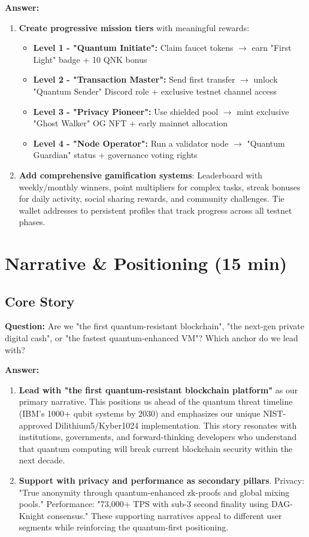 \documentclass[11pt,a4paper]{article}
\begin{document}
\textbf{Answer:}
\begin{enumerate}
\item \textbf{Create progressive mission tiers} with meaningful rewards:
\begin{itemize}
\item \textbf{Level 1 - "Quantum Initiate":} Claim faucet tokens $\rightarrow$ earn "First Light" badge + 10 QNK bonus
\item \textbf{Level 2 - "Transaction Master":} Send first transfer $\rightarrow$ unlock "Quantum Sender" Discord role + exclusive testnet channel access
\item \textbf{Level 3 - "Privacy Pioneer":} Use shielded pool $\rightarrow$ mint exclusive "Ghost Walker" OG NFT + early mainnet allocation
\item \textbf{Level 4 - "Node Operator":} Run a validator node $\rightarrow$ "Quantum Guardian" status + governance voting rights
\end{itemize}

\item \textbf{Add comprehensive gamification systems}: Leaderboard with weekly/monthly winners, point multipliers for complex tasks, streak bonuses for daily activity, social sharing rewards, and community challenges. Tie wallet addresses to persistent profiles that track progress across all testnet phases.
\end{enumerate}

\section{Narrative \& Positioning (15 min)}

\subsection{Core Story}
\textbf{Question:} Are we "the first quantum-resistant blockchain", "the next-gen private digital cash", or "the fastest quantum-enhanced VM"? Which anchor do we lead with?

\textbf{Answer:}
\begin{enumerate}
\item \textbf{Lead with "the first quantum-resistant blockchain platform"} as our primary narrative. This positions us ahead of the quantum threat timeline (IBM's 1000+ qubit systems by 2030) and emphasizes our unique NIST-approved Dilithium5/Kyber1024 implementation. This story resonates with institutions, governments, and forward-thinking developers who understand that quantum computing will break current blockchain security within the next decade.

\item \textbf{Support with privacy and performance as secondary pillars}. Privacy: "True anonymity through quantum-enhanced zk-proofs and global mixing pools." Performance: "73,000+ TPS with sub-3 second finality using DAG-Knight consensus." These supporting narratives appeal to different user segments while reinforcing the quantum-first positioning.
\end{enumerate}
\end{document}
